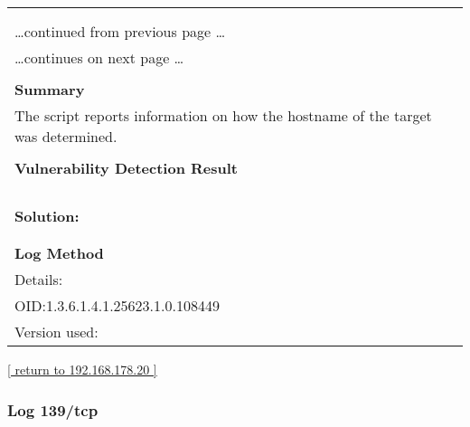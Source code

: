 \documentclass{article}
\begin{document}
\begin{longtable}{|p{}|}
\hline
\rowcolor{gvm_log}{\color{white}{Log (CVSS: 0.0) }}\\
\rowcolor{gvm_log}{\color{white}{NVT: Hostname Determination Reporting}}\\
\hline
\endfirsthead
\hfill\ldots continued from previous page \ldots \\
\hline
\endhead
\hline
\ldots continues on next page \ldots \\
\endfoot
\hline
\endlastfoot
\\
\textbf{Summary}\\
The script reports information on how the hostname
  of the target was determined.\\

        \hline
        \\
\textbf{Vulnerability Detection Result}\\
\rowcolor{white}{\verb=Hostname determination for IP 192.168.178.20:=}\\
\rowcolor{white}{\verb=Hostname|Source=}\\
\rowcolor{white}{\verb=homeprinter.fritz.box|Reverse-DNS=}\\

          \hline
          \\
\textbf{Solution:}\\
\\


        \hline
        \\
\textbf{Log Method}\\
Details:
\rowcolor{white}{\verb=Hostname Determination Reporting=}\\
OID:1.3.6.1.4.1.25623.1.0.108449\\
Version used:
\rowcolor{white}{\verb=2018-11-19T11:11:31Z=}\\
\end{longtable}

\begin{footnotesize}\hyperref[host:192.168.178.20]{[ return to 192.168.178.20 ]}\end{footnotesize}
\subsubsection{Log 139/tcp}
\label{port:192.168.178.20 139/tcp Log}
\end{document}
